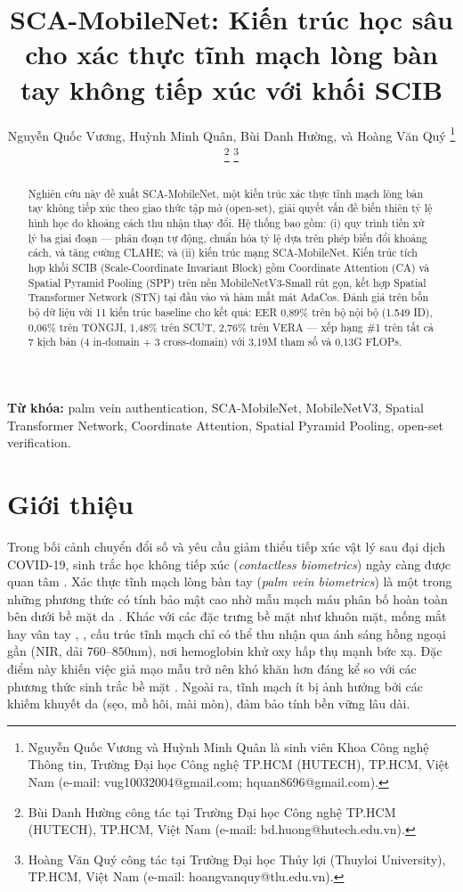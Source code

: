 \documentclass[12pt,a4paper]{article}
\begin{document}
\title{SCA-MobileNet: Kiến trúc học sâu cho xác thực tĩnh mạch lòng bàn tay không tiếp xúc với khối SCIB}

\author{Nguyễn Quốc Vương, Huỳnh Minh Quân, Bùi Danh Hường, và Hoàng Văn Quý%
\thanks{Nguyễn Quốc Vương và Huỳnh Minh Quân là sinh viên Khoa Công nghệ Thông tin, Trường Đại học Công nghệ TP.HCM (HUTECH), TP.HCM, Việt Nam (e-mail: vug10032004@gmail.com; hquan8696@gmail.com).}%
\thanks{Bùi Danh Hường công tác tại Trường Đại học Công nghệ TP.HCM (HUTECH), TP.HCM, Việt Nam (e-mail: bd.huong@hutech.edu.vn).}%
\thanks{Hoàng Văn Quý công tác tại Trường Đại học Thủy lợi (Thuyloi University), TP.HCM, Việt Nam (e-mail: hoangvanquy@tlu.edu.vn).}%
}

\maketitle


\begin{abstract}
Nghiên cứu này đề xuất SCA-MobileNet, một kiến trúc xác thực tĩnh mạch lòng bàn tay không tiếp xúc theo giao thức tập mở (open-set), giải quyết vấn đề biến thiên tỷ lệ hình học do khoảng cách thu nhận thay đổi. Hệ thống bao gồm: (i) quy trình tiền xử lý ba giai đoạn --- phân đoạn tự động, chuẩn hóa tỷ lệ dựa trên phép biến đổi khoảng cách, và tăng cường CLAHE; và (ii) kiến trúc mạng SCA-MobileNet. Kiến trúc tích hợp khối SCIB (Scale-Coordinate Invariant Block) gồm Coordinate Attention (CA) và Spatial Pyramid Pooling (SPP) trên nền MobileNetV3-Small rút gọn, kết hợp Spatial Transformer Network (STN) tại đầu vào và hàm mất mát AdaCos. Đánh giá trên bốn bộ dữ liệu với 11 kiến trúc baseline cho kết quả: EER 0,89\% trên bộ nội bộ (1.549 ID), 0,06\% trên TONGJI, 1,48\% trên SCUT, 2,76\% trên VERA --- xếp hạng \#1 trên tất cả 7 kịch bản (4 in-domain + 3 cross-domain) với 3,19M tham số và 0,13G FLOPs.
\end{abstract}

\medskip
\noindent\textbf{Từ khóa:} palm vein authentication, SCA-MobileNet, MobileNetV3, Spatial Transformer Network, Coordinate Attention, Spatial Pyramid Pooling, open-set verification.

\section{Giới thiệu}

Trong bối cảnh chuyển đổi số và yêu cầu giảm thiểu tiếp xúc vật lý sau đại dịch COVID-19, sinh trắc học không tiếp xúc (\textit{contactless biometrics}) ngày càng được quan tâm \cite{b_covid1}. Xác thực tĩnh mạch lòng bàn tay (\textit{palm vein biometrics}) là một trong những phương thức có tính bảo mật cao nhờ mẫu mạch máu phân bố hoàn toàn bên dưới bề mặt da \cite{b_covid2}. Khác với các đặc trưng bề mặt như khuôn mặt, mống mắt hay vân tay \cite{b18}, \cite{b19}, cấu trúc tĩnh mạch chỉ có thể thu nhận qua ánh sáng hồng ngoại gần (NIR, dải $760\text{--}850\text{nm}$), nơi hemoglobin khử oxy hấp thụ mạnh bức xạ. Đặc điểm này khiến việc giả mạo mẫu trở nên khó khăn hơn đáng kể so với các phương thức sinh trắc bề mặt \cite{b5}. Ngoài ra, tĩnh mạch ít bị ảnh hưởng bởi các khiếm khuyết da (sẹo, mồ hôi, mài mòn), đảm bảo tính bền vững lâu dài.
\end{document}
